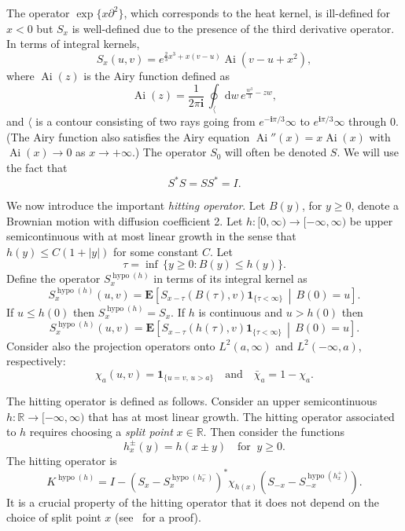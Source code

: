 \documentclass[AHL,Unicode,longabstracts]{cedram}
\newcommand*{\dd}{\mathrm{d}}
\newcommand*{\myangle}{\mathord{\langle}} %
\DeclareMathOperator{\hypo}{hypo}
\DeclareMathOperator{\Ai}{Ai}
\newcommand{\E}[1]{\mathbf{E}\left[#1\right]}
\newcommand{\ind}[1]{\mathbf{1}_{\{ #1 \}}}
\newcommand{\R}{\mathbb{R}}
\begin{document}
The operator $\exp \{x \partial^2\}$, which corresponds to the heat kernel, is ill-defined for $x < 0$ but $S_x$ is well-defined due to the presence of the third derivative operator. In terms of integral kernels,
\begin{equation}\label{eqn:Skernel}
S_x(u,v) = e^{\frac{2}{3}x^3 + x(v-u)} \Ai(v-u + x^2),
\end{equation}
where $\Ai(z)$ is the Airy function defined as
\begin{equation}\label{eqn:Aifunc}
\Ai(z) = \frac{1}{2 \pi \mathbf{i}} \, \oint_{\myangle} \dd w \, e^{\frac{w^3}{3} - z w},
\end{equation}
and $\myangle$ is a contour consisting of two rays going from $e^{-\mathbf{i} \pi/3} \infty$ to $e^{\mathbf{i} \pi/3} \infty$ through 0. (The Airy function also satisfies the Airy equation $\Ai'' (x) = x \Ai(x)$ with $\Ai(x) \to 0$ as $x \to + \infty$.) The operator $S_0$ will often be denoted $S$. We will use the fact that
\[
S^{*} S = S S^{*} = I.
\]

We now introduce the important \emph{hitting operator}. Let $B(y)$, for $y \geq 0$, denote a Brownian motion with diffusion coefficient 2. Let $h : [0,\infty) \to [-\infty, \infty)$ be upper semicontinuous with at most linear growth in the sense that $h(y) \leq C (1+ |y|)$ for some constant $C$. Let
\[
\tau = \inf \, \{ y \geq 0: B(y) \leq h(y)\}.
\]
Define the operator $S^{\hypo(h)}_x$ in terms of its integral kernel as
\begin{equation}\label{eqn:hypokernel}
S^{\hypo(h)}_x(u,v) = \E{S_{x-\tau}(B(\tau),v)\ind{\tau < \infty} \,\middle|\, B(0) = u}.
\end{equation}
If $u \leq h(0)$ then $S^{\hypo(h)}_x = S_x$. If $h$ is continuous and $u > h(0)$ then
\[
S^{\hypo(h)}_x(u,v) = \E{S_{x-\tau}(h(\tau),v)\ind{\tau < \infty} \,\middle|\, B(0) = u}.
\]
Consider also the projection operators onto $L^2(a,\infty)$ and $L^2(-\infty, a)$, respectively:
\begin{equation}\label{eqn:proj}
\chi_a(u,v) = \ind{u = v, \,u > a} \quad \text{and} \quad \bar{\chi}_a = 1 - \chi_a.
\end{equation}

The hitting operator is defined as follows. Consider an upper semicontinuous $h : \R \to [-\infty, \infty)$ that has at most linear growth. The hitting operator associated to $h$ requires choosing a \emph{split point} $x \in \R$. Then consider the functions
\[
h^{\pm}_x(y) = h(x \pm y) \quad \text{for}\;\; y \geq 0.
\]
The hitting operator is
\begin{equation}\label{eqn:hitkernel}
K^{\hypo(h)} = I - \left (S_x - S^{\hypo(h^{-}_x)}_x \right)^{*} \chi_{h(x)}
\left (S_{-x} - S^{\hypo(h^{+}_x)}_{-x}\right).
\end{equation}
It is a crucial property of the hitting operator that it does not depend on the choice of split point $x$ (see~\cite{QR1} for a proof).
\end{document}
